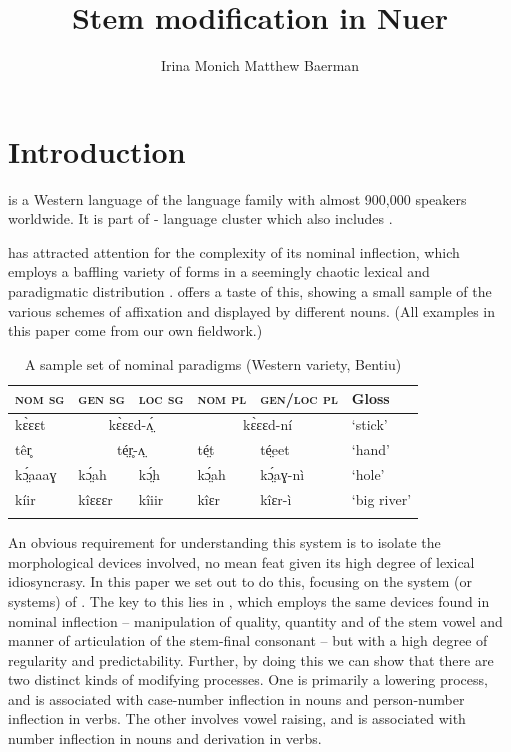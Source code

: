 \documentclass[output=paper,newtxmath,modfonts,nonflat]{langsci/langscibook}
\title{Stem modification in Nuer}
\author{Irina Monich\affiliation{University of Surrey} \lastand Matthew Baerman\affiliation{University of Surrey}}
\begin{document}
\maketitle

\section{Introduction} %

 is a Western  language of the  language family with almost 900,000 speakers worldwide. It is part of - language cluster which also includes . 

 has attracted attention for the complexity of its nominal inflection, which employs a baffling variety of forms in a seemingly chaotic lexical and paradigmatic distribution \citep{Frank1999, Baerman2012}.  offers a taste of this, showing a small sample of the various schemes of affixation and  displayed by different nouns. (All examples in this paper come from our own fieldwork.)



\begin{table}
\begin{tabularx}{\textwidth}{XXlXlX}
\lsptoprule
\bfseries\scshape nom sg & \bfseries\scshape gen sg & \bfseries\scshape loc sg & \bfseries\scshape nom pl & \bfseries\scshape gen/loc pl & \bfseries Gloss\\
\midrule
kɛ̀ɛɛt & \multicolumn{2}{c}{kɛ̀ɛɛd-ʌ̤́} & \multicolumn{2}{c}{kɛ̀ɛɛd-ní} & ‘stick’\\
têr̥ & \multicolumn{2}{c}{té̤r̥-ʌ̤} & té̤t & té̤eet & ‘hand’\\
kɔ̤́aaaɣ & kɔ̤́ah & kɔ̤́h & kɔ̤́ah & kɔ̤́aɣ-nì & ‘hole’\\
kíir & kîɛɛɛr & kîiir & kîɛr & kîɛr-ì & ‘big river’\\
\lspbottomrule
\end{tabularx}
\caption{A sample set of nominal paradigms (Western variety, Bentiu)}
\label{tab:monich:1}
\end{table}

An obvious requirement for understanding this system is to isolate the morphological devices involved, no mean feat given its high degree of lexical idiosyncrasy. In this paper we set out to do this, focusing on the system (or systems) of . The key to this lies in , which employs the same devices found in nominal inflection – manipulation of quality, quantity and  of the stem vowel and manner of articulation of the stem-final consonant – but with a high degree of regularity and predictability. Further, by doing this we can show that there are two distinct kinds of  modifying processes. One is primarily a lowering process, and is associated with case-number inflection in nouns and person-number inflection in verbs. The other involves vowel raising, and is associated with number inflection in nouns and derivation in verbs.
\end{document}
